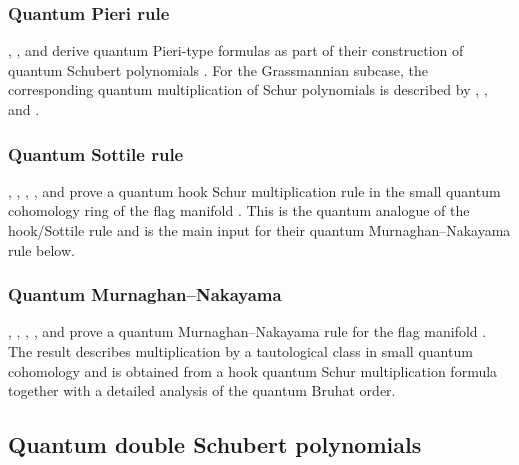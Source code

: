 \subsubsection[schubertQuantumPieriRule]{Quantum Pieri rule}

, , and 
derive quantum Pieri-type formulas as part of their construction of quantum
Schubert polynomials \cite{FominGelfandPostnikov1997}.
For the Grassmannian subcase, the corresponding quantum multiplication of
Schur polynomials is described by ,
, and
 \cite{BertramCiocanFontanineFulton1999}.

\subsubsection[schubertQuantumSottileRule]{Quantum Sottile rule}

, ,
, , and 
prove a quantum hook Schur multiplication rule in the small quantum
cohomology ring of the flag manifold
\cite[Thm.~3.2]{BenedettiVelasquezBergeronColmenarejoSaliolaSottile2025}.
This is the quantum analogue of the hook/Sottile rule and is the main input
for their quantum Murnaghan--Nakayama rule below.

\subsubsection[schubertQuantumMurnaghanNakayama]{Quantum Murnaghan--Nakayama}

, ,
, , and 
prove a quantum Murnaghan--Nakayama rule for the flag manifold
\cite{BenedettiVelasquezBergeronColmenarejoSaliolaSottile2025}.  The result
describes multiplication by a tautological class in small quantum cohomology
and is obtained from a hook quantum Schur multiplication formula together
with a detailed analysis of the quantum Bruhat order.




\subsection[schubertQuantumDouble]{Quantum double Schubert polynomials}


